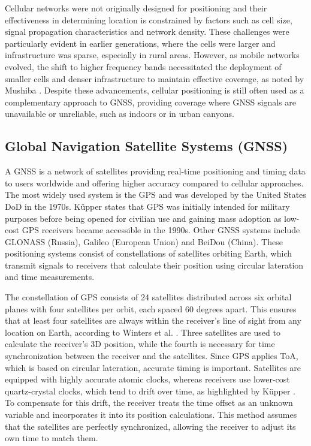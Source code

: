 Cellular networks were not originally designed for positioning and their effectiveness in determining location is constrained by factors such as cell size, signal propagation characteristics and network density. 
These challenges were particularly evident in earlier generations, where the cells were larger and infrastructure was sparse, especially in rural areas.
However, as mobile networks evolved, the shift to higher frequency bands necessitated the deployment of smaller cells and denser infrastructure to maintain effective coverage, as noted by Mushiba \cite{mushiba2024gsm}. 
Despite these advancements, cellular positioning is still often used as a complementary approach to \acs{GNSS}, providing coverage where \acs{GNSS} signals are unavailable or unreliable, such as indoors or in urban canyons.

\subsection{Global Navigation Satellite Systems (GNSS)}
\label{sec:gnss}
A \acs{GNSS} is a network of satellites providing real-time positioning and timing data to users worldwide and offering higher accuracy compared to cellular approaches.
The most widely used system is the \ac{GPS} and was developed by the United States \ac{DoD} in the 1970s.
K\"upper \cite{kupper2005location} states that \acs{GPS} was initially intended for military purposes before being opened for civilian use and gaining mass adoption as low-cost GPS receivers became accessible in the 1990s.
Other GNSS systems include GLONASS (Russia), Galileo (European Union) and BeiDou (China). 
These positioning systems consist of constellations of satellites orbiting Earth, which transmit signals to receivers that calculate their position using circular lateration and time measurements.

The constellation of \acs{GPS} consists of 24 satellites distributed across six orbital planes with four satellites per orbit, each spaced 60 degrees apart. 
This ensures that at least four satellites are always within the receiver's line of sight from any location on Earth, according to Winters et al. \cite{winters2008travel}.  
Three satellites are used to calculate the receiver's 3D position, while the fourth is necessary for time synchronization between the receiver and the satellites. 
Since \acs{GPS} applies \ac{ToA}, which is based on circular lateration, accurate timing is important. 
Satellites are equipped with highly accurate atomic clocks, whereas receivers use lower-cost quartz-crystal clocks, which tend to drift over time, as highlighted by K\"upper \cite{kupper2005location}. 
To compensate for this drift, the receiver treats the time offset as an unknown variable and incorporates it into its position calculations. 
This method assumes that the satellites are perfectly synchronized, allowing the receiver to adjust its own time to match them.  

